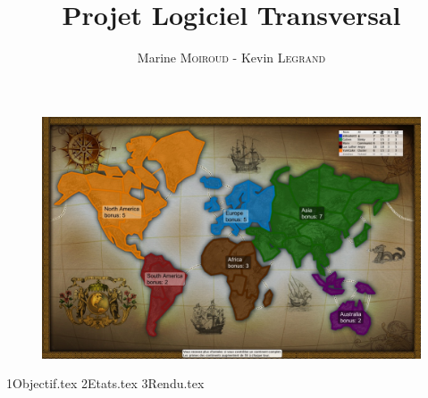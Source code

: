 \documentclass[12pt]{article}
\title{\textbf{\huge Projet Logiciel Transversal}}
\author{Marine \textsc{Moiroud} - Kevin \textsc{Legrand}}
\newcommand*{\sourcedir}{Sources/}
\begin{document}
    
    \maketitle 
     \begin{figure}[!htbp]
        \centering
        \includegraphics[width=15cm]{Images/risk.jpg}
    \end{figure}
    \newpage
    \newpage
    \tableofcontents
    \newpage
    
    {1Objectif.tex}
    \newpage
    {2Etats.tex}
    \newpage
    {3Rendu.tex}
    \newpage
    \newpage
    \newpage
    
\end{document}
